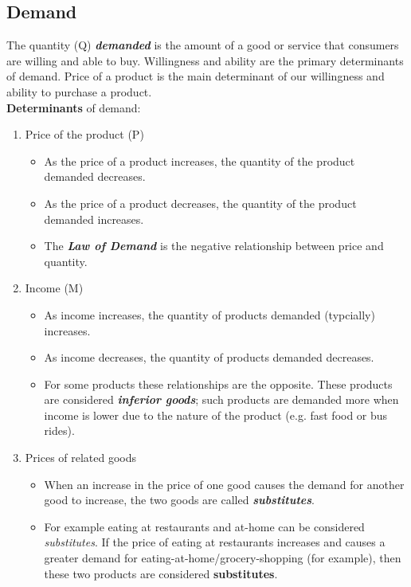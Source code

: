 \documentclass{article}
\newcommand{\bold}[1]{\textbf{#1}}
\newcommand{\define}[1]{\textbf{\textit{#1}}}
\begin{document}
\subsection{Demand}

The quantity (Q) \define{demanded} is the amount of a good or service that consumers are willing and able to buy. Willingness and ability are the primary determinants of demand. Price of a product is the main determinant of our willingness and ability to purchase a product. \\ 

\bold{Determinants} of demand: 
\begin{enumerate}
  \item Price of the product (P) \\ 
    \begin{itemize}
      \item As the price of a product increases, the quantity of the product demanded decreases. \\ 
      \item As the price of a product decreases, the quantity of the product demanded increases. \\ 
      \item The \define{Law of Demand} is the negative relationship between price and quantity. 
    \end{itemize}
  \item Income (M)
    \begin{itemize}
      \item As income increases, the quantity of products demanded (typcially) increases. 
      \item As income decreases, the quantity of products demanded decreases. 
      \item For some products these relationships are the opposite. These products are considered \define{inferior goods}; such products are demanded more when income is lower due to the nature of the product (e.g. fast food or bus rides). 
    \end{itemize}
  \item Prices of related goods 
    \begin{itemize}
      \item When an increase in the price of one good causes the demand for another good to increase, the two goods are called \define{substitutes}. 
      \item For example eating at restaurants and at-home can be considered \emph{substitutes}. If the price of eating at restaurants increases and causes a greater demand for eating-at-home/grocery-shopping (for example), then these two products are considered \bold{substitutes}. 

\end{itemize}
\end{enumerate}
\end{document}
